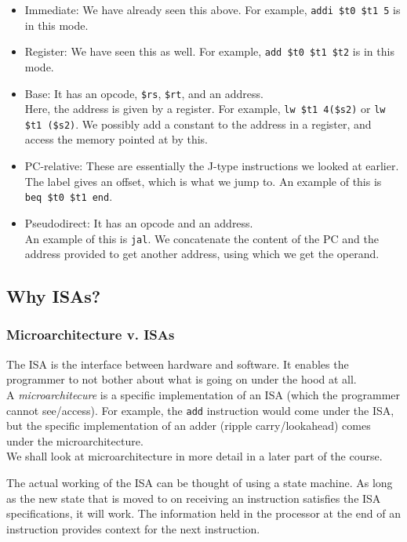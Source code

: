 \documentclass{article}
\begin{document}
		\begin{itemize}
			\item Immediate: We have already seen this above. For example, \texttt{addi \$t0 \$t1 5} is in this mode.
			\item Register: We have seen this as well. For example, \texttt{add \$t0 \$t1 \$t2} is in this mode.
			\item Base: It has an opcode, \texttt{\$rs}, \texttt{\$rt}, and an address.\\
			Here, the address is given by a register. For example, \texttt{lw \$t1 4(\$s2)} or \texttt{lw \$t1 (\$s2)}. We possibly add a constant to the address in a register, and access the memory pointed at by this.
			\item PC-relative: These are essentially the J-type instructions we looked at earlier. The label gives an offset, which is what we jump to. An example of this is \texttt{beq \$t0 \$t1 end}.
			\item Pseudodirect: It has an opcode and an address.\\
			An example of this is \texttt{jal}. We concatenate the content of the PC and the address provided to get another address, using which we get the operand.
		\end{itemize}

	\subsection{Why ISAs?}

		\subsubsection{Microarchitecture v. ISAs}

			The ISA is the interface between hardware and software. It enables the programmer to not bother about what is going on under the hood at all.\\
			A \emph{microarchitecure} is a specific implementation of an ISA (which the programmer cannot see/access). For example, the \texttt{add} instruction would come under the ISA, but the specific implementation of an adder (ripple carry/lookahead) comes under the microarchitecture.\\
			We shall look at microarchitecture in more detail in a later part of the course.

			The actual working of the ISA can be thought of using a state machine. As long as the new state that is moved to on receiving an instruction satisfies the ISA specifications, it will work. The information held in the processor at the end of an instruction provides context for the next instruction.
\end{document}

